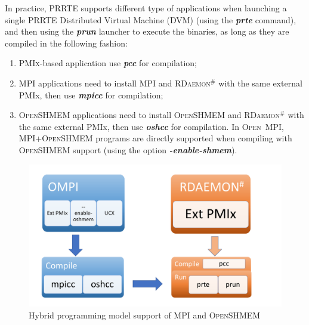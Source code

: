\documentclass[5p,times,twocolumn]{elsarticle}
\newcommand{\prrte}[0]{\textsc{PRRTE}\xspace}
\newcommand{\pmix}[0]{\textsc{PMIx}\xspace}
\newcommand{\ompi}[0]{\textsc{Open~MPI}\xspace}
\newcommand{\mpi}[0]{\textsc{MPI}\xspace}
\newcommand{\oshmem}[0]{\textsc{OpenSHMEM}\xspace}
\newcommand{\ourwork}[0]{\textsc{RDaemon}\ensuremath{^\#}\xspace}
\begin{document}
In practice, \prrte supports different type of applications when launching a single \prrte Distributed Virtual Machine (DVM) (using the \textbf{\emph{prte}} command), and then using the \textbf{\emph{prun}} launcher to execute the binaries, as long as they are compiled in the following fashion:
\begin{enumerate}
  \item \pmix-based application use \textbf{\emph{pcc}} for compilation;
  \item \mpi applications need to install \mpi and \ourwork with the same external PMIx, then use \textbf{\emph{mpicc}} for compilation;
  \item \oshmem applications need to install \oshmem and \ourwork with the same external PMIx, then use \textbf{\emph{oshcc}} for compilation. In \ompi, \mpi+\oshmem programs are directly supported when compiling with \oshmem support (using the option \textbf{\emph{-enable-shmem}}).
\end{enumerate}

\begin{figure}[h]
  \centering
  \includegraphics[width=\linewidth]{prrte_with_oshmem.pdf}\vspace{-1em}
  \caption{Hybrid programming model support of MPI and \oshmem}
  \label{fig:prrte.with.oshmem}
\end{figure}
\end{document}
